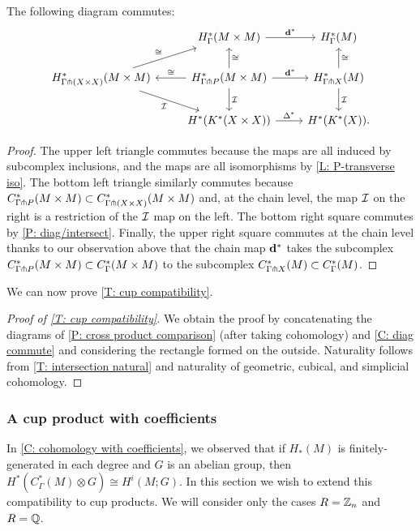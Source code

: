 \begin{corollary}\label{C: diag commute}
	The following diagram commutes:
	\[
	\begin{tikzcd}
		&H^*_{\Gamma}(M \times M) \arrow[r,"\diag^*"]& H^*_{\Gamma}(M) \\
	H^*_{\Gamma \pf (X \times X)}(M \times M)  \arrow[rd,"\mc I"']\arrow[ru,"\cong"] & \arrow[l,"\cong"']H^*_{\Gamma \pf P}(M \times M) \arrow[r,"\diag^*"] \arrow[d,"\mc I"] \arrow[u,"\cong"']& H^*_{\Gamma \pf X}(M) \arrow[d,"\mc I"] \arrow[u,"\cong"'] \\
		&H^*(K^*(X\times X))	\arrow[r,"\Delta^*"] & H^*(K^*(X)) .
	\end{tikzcd}
	\]
\end{corollary}
\begin{proof}
	The upper left triangle commutes because the maps are all induced by subcomplex inclusions, and the maps are all isomorphisms by \cref{L: P-transverse iso}.
	The bottom left triangle similarly commutes because $C^*_{\Gamma \pitchfork P}(M \times M) \subset C^*_{\Gamma \pitchfork (X \times X)}(M \times M)$ and, at the chain level, the map $\mathcal{I}$ on the right is a restriction of the $\mathcal{I}$ map on the left.
	The bottom right square commutes by \cref{P: diag/intersect}.
	Finally, the upper right square commutes at the chain level thanks to our observation above that the chain map $\mathbf{d}^*$ takes the subcomplex $C^*_{\Gamma \pitchfork P}(M \times M) \subset C^*_\Gamma(M \times M)$ to the subcomplex $C^*_{\Gamma \pitchfork X}(M) \subset C^*_\Gamma(M)$.
\end{proof}

We can now prove \cref{T: cup compatibility}.

\begin{proof}[Proof of \cref{T: cup compatibility}]
We obtain the proof by concatenating the diagrams of \cref{P: cross product comparison} (after taking cohomology) and \cref{C: diag commute} and considering the rectangle formed on the outside. Naturality follows from \cref{T: intersection natural} and naturality of geometric, cubical, and simplicial cohomology.
\end{proof}


\subsubsection{A cup product with coefficients}

In \cref{C: cohomology with coefficients}, we observed that if $H_*(M)$ is finitely-generated in each degree and $G$ is an abelian group, then $H^*(C^*_\Gamma(M) \otimes G) \cong H^i(M;G)$.
In this section we wish to extend this compatibility to cup products. We will consider only the cases $R=\mathbb{Z}_n$ and $R=\mathbb{Q}$.



